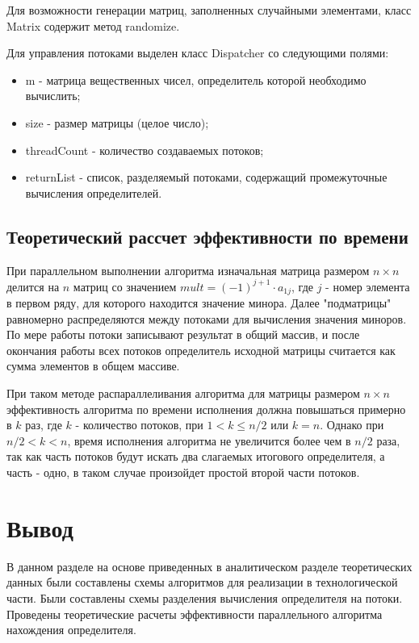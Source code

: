 \documentclass[12pt]{report}
\begin{document}
    Для возможности генерации матриц, заполненных случайными элементами, класс Matrix содержит метод randomize.
    
    Для управления потоками выделен класс Dispatcher со следующими полями:
    \begin{itemize}
    	\item m - матрица вещественных чисел, определитель которой необходимо вычислить;
    	\item size - размер матрицы (целое число);
    	\item threadCount - количество создаваемых потоков;
    	\item returnList - список, разделяемый потоками, содержащий промежуточные вычисления определителей.
    \end{itemize}
    

    \subsection{Теоретический рассчет эффективности по времени}

    При параллельном выполнении алгоритма изначальная матрица размером $n \times n$ делится на $n$ матриц
    со значением $mult = (-1)^{j + 1} \cdot a_{1j}$,
    где $j$ - номер элемента в первом ряду, для которого находится значение минора.
    Далее "подматрицы" равномерно распределяются между потоками для вычисления значения миноров.
    По мере работы потоки записывают результат в общий массив, и после окончания работы всех потоков
    определитель исходной матрицы считается как сумма элементов в общем массиве.

    При таком методе распараллеливания алгоритма для матрицы размером $n \times n$ эффективность
    алгоритма по времени исполнения должна повышаться примерно в $k$ раз, где $k$ - количество потоков,
    при $1 < k \leq n / 2$ или $k = n$.
    Однако при $ n / 2 < k < n$, время исполнения алгоритма не увеличится более чем в $n / 2$ раза,
    так как часть потоков будут искать два слагаемых итогового определителя, а часть - одно,
    в таком случае произойдет простой второй части потоков.


    \section{Вывод}
    В данном разделе на основе приведенных в аналитическом разделе теоретических данных
    были составлены схемы алгоритмов для реализации в технологической части.
    Были составлены схемы разделения вычисления определителя на потоки.
    Проведены теоретические расчеты эффективности параллельного алгоритма нахождения определителя.
    \newpage
\end{document}
